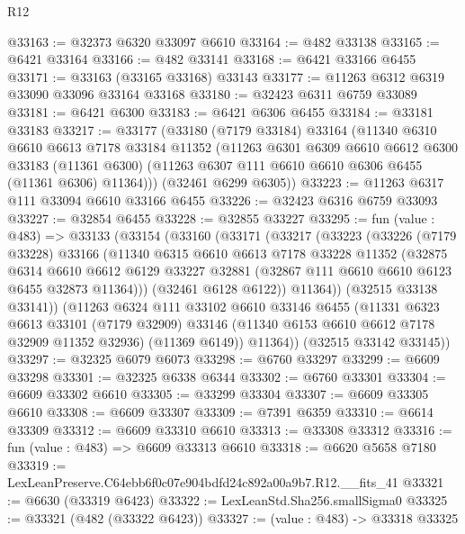 \begin{lexlean}{R12}
\begin{coremodule}
@33163 := @32373 @6320 @33097 @6610
@33164 := @482 @33138
@33165 := @6421 @33164
@33166 := @482 @33141
@33168 := @6421 @33166 @6455
@33171 := @33163 (@33165 @33168) @33143
@33177 := @11263 @6312 @6319 @33090 @33096 @33164 @33168
@33180 := @32423 @6311 @6759 @33089
@33181 := @6421 @6300
@33183 := @6421 @6306 @6455
@33184 := @33181 @33183
@33217 := @33177
    (@33180
      (@7179 @33184)
      @33164
      (@11340
        @6310
        @6610
        @6613
        @7178
        @33184
        @11352
        (@11263
          @6301
          @6309
          @6610
          @6612
          @6300
          @33183
          (@11361 @6300)
          (@11263 @6307 @111 @6610 @6610 @6306 @6455 (@11361 @6306) @11364)))
      (@32461 @6299 @6305))
@33223 := @11263 @6317 @111 @33094 @6610 @33166 @6455
@33226 := @32423 @6316 @6759 @33093
@33227 := @32854 @6455
@33228 := @32855 @33227
@33295 := fun (value : @483) =>
  @33133
    (@33154
      (@33160
        (@33171
          (@33217
            (@33223
              (@33226
                (@7179 @33228)
                @33166
                (@11340
                  @6315
                  @6610
                  @6613
                  @7178
                  @33228
                  @11352
                  (@32875
                    @6314
                    @6610
                    @6612
                    @6129
                    @33227
                    @32881
                    (@32867 @111 @6610 @6610 @6123 @6455 @32873 @11364)))
                (@32461 @6128 @6122))
              @11364))
          (@32515 @33138 @33141))
        (@11263
          @6324
          @111
          @33102
          @6610
          @33146
          @6455
          (@11331
            @6323
            @6613
            @33101
            (@7179 @32909)
            @33146
            (@11340 @6153 @6610 @6612 @7178 @32909 @11352 @32936)
            (@11369 @6149))
          @11364))
      (@32515 @33142 @33145))
@33297 := @32325 @6079 @6073
@33298 := @6760 @33297
@33299 := @6609 @33298
@33301 := @32325 @6338 @6344
@33302 := @6760 @33301
@33304 := @6609 @33302 @6610
@33305 := @33299 @33304
@33307 := @6609 @33305 @6610
@33308 := @6609 @33307
@33309 := @7391 @6359
@33310 := @6614 @33309
@33312 := @6609 @33310 @6610
@33313 := @33308 @33312
@33316 := fun (value : @483) => @6609 @33313 @6610
@33318 := @6620 @5658 @7180
@33319 := LexLeanPreserve.C64ebb6f0c07e904bdfd24c892a00a9b7.R12.__fits_41
@33321 := @6630 (@33319 @6423)
@33322 := LexLeanStd.Sha256.smallSigma0
@33325 := @33321 (@482 (@33322 @6423))
@33327 := (value : @483) -> @33318 @33325

\end{coremodule}
\end{lexlean}
